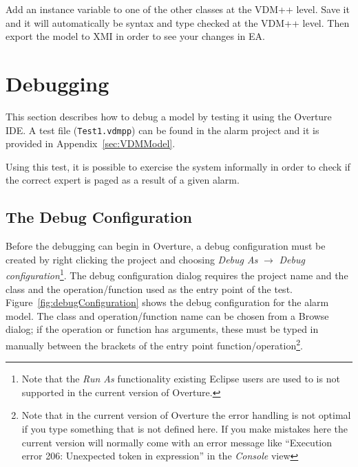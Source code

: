\begin{myexercise}\label{ex:rosemapping}
Add an instance variable to one of the other classes at the VDM++
level. Save it and it will automatically be syntax and type checked at
the VDM++ level. Then export the model to XMI in order to see your
changes in EA.
\end{myexercise}



\section{Debugging}\label{sec:debugging}

This section describes how to debug a model by testing it using the
Overture IDE. A test file (\texttt{Test1.vdmpp}) can be
found in the alarm project and it is provided in
Appendix~\ref{sec:VDMModel}.

\lstset{language=VDM++}
%

Using this test, it is possible to exercise the system informally in
order to check if the correct expert is paged as a result of a given
alarm.


\subsection{The Debug Configuration}

Before the debugging can begin in Overture, a debug configuration must
be created by right clicking the project and choosing \emph{Debug As}
$ \rightarrow $ \emph{Debug configuration}\footnote{Note that the
  \emph{Run As} functionality existing Eclipse users are used to is
  not supported in the current version of Overture.}. The debug configuration
dialog requires the project name and the class and the operation/function
used as the entry point of the test.  Figure~\ref{fig:debugConfiguration}
shows the debug configuration for the alarm model. The class and
operation/function name can be chosen from a Browse dialog; if the
operation or function has arguments, these must be typed in manually
between the brackets of the entry point
function/operation\footnote{Note that in the current version of
  Overture the error handling is not optimal if you type something
  that is not defined here. If you make mistakes here the current
  version will normally come with an error message like ``Execution
  error 206: Unexpected token in expression'' in the \emph{Console} view}.

